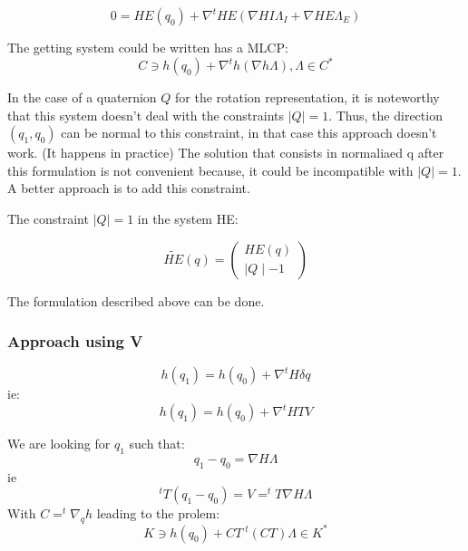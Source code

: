 \begin{equation}
  0=HE(q_0) + \nabla ^t HE (\nabla HI  \Lambda _I + \nabla HE \Lambda _E)
\end{equation}

The getting system could be written has a MLCP:
\begin{equation}
C \ni h(q_0)+ \nabla ^t h(\nabla h\Lambda) , \Lambda \in C^*
\end{equation}

In the case of a quaternion $Q$ for the rotation representation, it is noteworthy that this system doesn't deal with the constraints $\mid Q \mid = 1$. Thus, the direction $(q_1,q_0)$ can be normal to this constraint, in that case this approach doesn't work. (It happens in practice) The solution that consists in normaliaed q after this formulation is not convenient because, it could be incompatible with $\mid Q \mid = 1$. A better approach is to add this constraint.


The constraint $\mid Q \mid = 1$ in the system HE:

\begin{equation}
  \tilde {HE}(q)= \left(\begin{array}{l}
    HE(q)\\
    \mid Q \mid -1
\end{array}\right)
\end{equation}

The formulation described above can be done. 
\subsubsection{Approach using V}
\begin{equation}
\label{NE_projV}
h(q_1) = h(q_0)+\nabla ^t H \delta q
\end{equation}
ie:
\begin{equation}
\label{NE_projV}
h(q_1) = h(q_0)+\nabla ^t H T V
\end{equation}

We are looking for $q_1$ such that:
\begin{equation}
  q_1-q_0 = \nabla H \Lambda
\end{equation}
ie
\begin{equation}
  ^tT(q_1-q_0)=V= ^tT \nabla H\Lambda
\end{equation}
With $C=^t\nabla _q h$ leading to the prolem:
\begin{equation}
K \ni h(q_0)+ CT~ ^t (CT)   \Lambda \in K^*
\end{equation}
